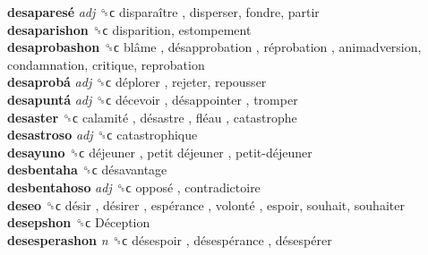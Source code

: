 \textbf{desaparesé} \emph{adj}  ␝ϲ   disparaître , disperser, fondre, partir  \\
\textbf{desaparishon} ␝ϲ  disparition, estompement  \\
\textbf{desaprobashon} ␝ϲ   blâme ,  désapprobation ,  réprobation , animadversion, condamnation, critique, reprobation  \\
\textbf{desaprobá} \emph{adj}  ␝ϲ   déplorer , rejeter, repousser  \\
\textbf{desapuntá} \emph{adj}  ␝ϲ   décevoir ,  désappointer , tromper  \\
\textbf{desaster} ␝ϲ   calamité ,  désastre ,  fléau , catastrophe  \\
\textbf{desastroso} \emph{adj}  ␝ϲ  catastrophique  \\
\textbf{desayuno} ␝ϲ   déjeuner ,  petit déjeuner ,  petit-déjeuner   \\
\textbf{desbentaha} ␝ϲ   désavantage   \\
\textbf{desbentahoso} \emph{adj}  ␝ϲ   opposé , contradictoire  \\
\textbf{deseo} ␝ϲ   désir ,  désirer ,  espérance ,  volonté , espoir, souhait, souhaiter  \\
\textbf{desepshon} ␝ϲ   Déception   \\
\textbf{desesperashon} \emph{n}  ␝ϲ   désespoir ,  désespérance ,  désespérer   \\
